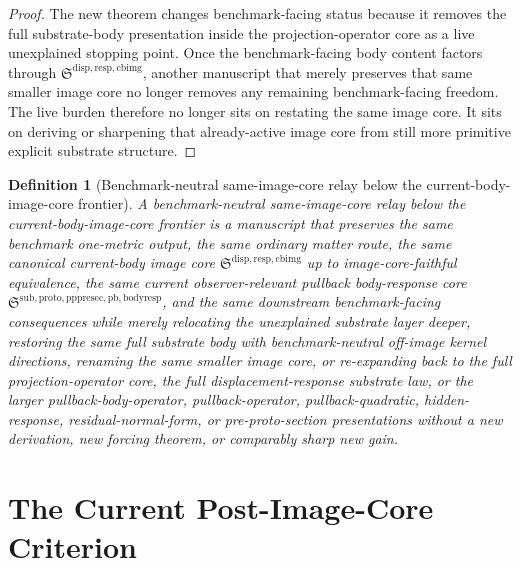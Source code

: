\documentclass[11pt]{article}
\newcommand{\CurrentBodyImageCore}{\mathfrak S^{\mathrm{disp,resp,cbimg}}}
\newcommand{\PullbackBodyResponseCore}{\mathfrak S^{\mathrm{sub,proto,pppresec,pb,bodyresp}}}
\newtheorem{definition}{Definition}
\begin{document}
\begin{proof}
The new theorem changes benchmark-facing status because it removes the full substrate-body presentation inside the projection-operator core as a live unexplained stopping point. Once the benchmark-facing body content factors through \(\CurrentBodyImageCore\), another manuscript that merely preserves that same smaller image core no longer removes any remaining benchmark-facing freedom. The live burden therefore no longer sits on restating the same image core. It sits on deriving or sharpening that already-active image core from still more primitive explicit substrate structure.
\end{proof}

\begin{definition}[Benchmark-neutral same-image-core relay below the current-body-image-core frontier]
A \emph{benchmark-neutral same-image-core relay below the current-body-image-core frontier} is a manuscript that preserves the same benchmark one-metric output, the same ordinary matter route, the same canonical current-body image core \(\CurrentBodyImageCore\) up to image-core-faithful equivalence, the same current observer-relevant pullback body-response core \(\PullbackBodyResponseCore\), and the same downstream benchmark-facing consequences while merely relocating the unexplained substrate layer deeper, restoring the same full substrate body with benchmark-neutral off-image kernel directions, renaming the same smaller image core, or re-expanding back to the full projection-operator core, the full displacement-response substrate law, or the larger pullback-body-operator, pullback-operator, pullback-quadratic, hidden-response, residual-normal-form, or pre-proto-section presentations without a new derivation, new forcing theorem, or comparably sharp new gain.
\end{definition}

\section{The Current Post-Image-Core Criterion}
\end{document}

